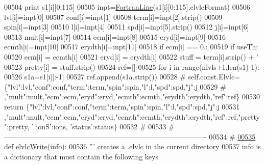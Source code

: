 \begin{DoxyCode}
{{{{{00504             \textcolor{keywordflow}{print} s1[i][0:115]
00505         inpt=\hyperlink{classpyneb_1_1utils_1_1_fortran_format_1_1_fortran_line}{FortranLine}(s1[i][0:115],elvlcFormat)
00506         lvl[i]=inpt[0]
00507         conf[i]=inpt[1]
00508         term[i]=inpt[2].strip()
00509         spin[i]=inpt[3]
00510         l[i]=inpt[4]
00511         spd[i]=inpt[5].strip()
00512         j[i]=inpt[6]
00513         mult[i]=inpt[7]
00514         ecm[i]=inpt[8]
00515         eryd[i]=inpt[9]
00516         ecmth[i]=inpt[10]
00517         erydth[i]=inpt[11]
00518         \textcolor{keywordflow}{if} ecm[i] == 0.:
00519             \textcolor{keywordflow}{if} useTh:
00520                 ecm[i] = ecmth[i]
00521                 eryd[i] = erydth[i]
00522         stuff = term[i].strip() + \textcolor{stringliteral}{' %
00523         pretty[i] = stuff.strip()
00524     ref=[]
00525     \textcolor{keywordflow}{for} i \textcolor{keywordflow}{in} range(nlvls+1,len(s1)-1):
00526         s1a=s1[i][:-1]
00527         ref.append(s1a.strip())
00528 \textcolor{comment}{#    self.const.Elvlc=\{"lvl":lvl,"conf":conf,"term":term,"spin":spin,"l":l,"spd":spd,"j":j}
00529 \textcolor{comment}{#            ,"mult":mult,"ecm":ecm,"eryd":eryd,"ecmth":ecmth,"erydth":erydth,"ref":ref\}}
00530     \textcolor{keywordflow}{return} \{\textcolor{stringliteral}{"lvl"}:lvl,\textcolor{stringliteral}{"conf"}:conf,\textcolor{stringliteral}{"term"}:term,\textcolor{stringliteral}{"spin"}:spin,\textcolor{stringliteral}{"l"}:l,\textcolor{stringliteral}{"spd"}:spd,\textcolor{stringliteral}{"j"}:j
00531             ,\textcolor{stringliteral}{"mult"}:mult,\textcolor{stringliteral}{"ecm"}:ecm,\textcolor{stringliteral}{"eryd"}:eryd,\textcolor{stringliteral}{"ecmth"}:ecmth,\textcolor{stringliteral}{"erydth"}:erydth,\textcolor{stringliteral}{"ref"}:ref,\textcolor{stringliteral}{"pretty"}:pretty, \textcolor{stringliteral}{'
      ionS'}:ions, \textcolor{stringliteral}{'status'}:status\}
00532     \textcolor{comment}{#}
00533     \textcolor{comment}{# -------------------------------------------------------------------------------------}
00534     \textcolor{comment}{#}
\hypertarget{__chianti__tools_8py_source_l00535}{}\hyperlink{namespacepyneb_1_1utils_1_1__chianti__tools_a279f0911664046ffd65c19571be8a84d}{00535} \textcolor{keyword}{def }\hyperlink{namespacepyneb_1_1utils_1_1__chianti__tools_a279f0911664046ffd65c19571be8a84d}{elvlcWrite}(info):
00536     \textcolor{stringliteral}{''' creates a .elvlc in the current directory}
00537 \textcolor{stringliteral}{    info is a dictionary that must contain the following keys}
}}}}}}
\end{DoxyCode}
